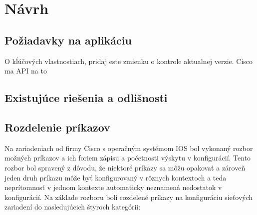 \chapter{Návrh}

\section{Požiadavky na aplikáciu}


O kĺúčových vlastnostiach, pridaj este zmienku o kontrole aktualnej verzie. Cisco ma API na to

\section{Existujúce riešenia a odlišnosti}

\section{Rozdelenie príkazov}
Na zariadeniach od firmy Cisco s operačným systémom IOS bol vykonaný rozbor možných príkazov a ich foriem zápisu a početnosti výskytu v konfigurácií. Tento rozbor bol spravený z dôvodu, že niektoré príkazy sa môžu opakovať a zároveň jeden druh príkazu môže byť konfigurovaný v rôznych kontextoch a teda neprítomnosť v jednom kontexte automaticky neznamená nedostatok v konfigurácií. Na základe rozboru boli rozdelené príkazy na konfiguráciu sieťových zariadení do nasledujúcich štyroch kategórií:
\\
